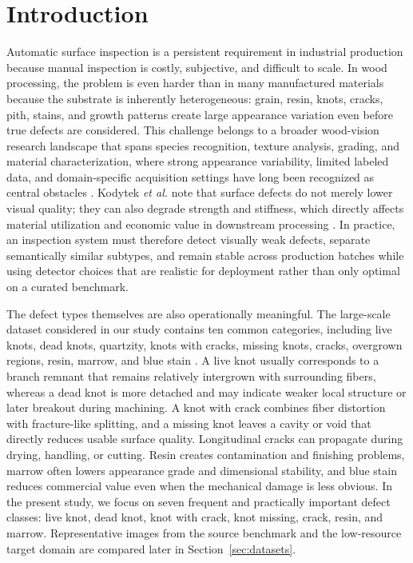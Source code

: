 
\section{Introduction}
\label{sec:introduction}

Automatic surface inspection is a persistent requirement in industrial production because manual inspection is costly, subjective, and difficult to scale. In wood processing, the problem is even harder than in many manufactured materials because the substrate is inherently heterogeneous: grain, resin, knots, cracks, pith, stains, and growth patterns create large appearance variation even before true defects are considered. This challenge belongs to a broader wood-vision research landscape that spans species recognition, texture analysis, grading, and material characterization, where strong appearance variability, limited labeled data, and domain-specific acquisition settings have long been recognized as central obstacles \citep{hwang_sugiyama_review,da_silva_2017,souza_2020,de_geus_2021,kirbas_2022,he_2021_woodresearch,herrera_poyatos_2024}. Kodytek \textit{et al.} note that surface defects do not merely lower visual quality; they can also degrade strength and stiffness, which directly affects material utilization and economic value in downstream processing \citep{kodytek_dataset}. In practice, an inspection system must therefore detect visually weak defects, separate semantically similar subtypes, and remain stable across production batches while using detector choices that are realistic for deployment rather than only optimal on a curated benchmark.

The defect types themselves are also operationally meaningful. The large-scale dataset considered in our study contains ten common categories, including live knots, dead knots, quartzity, knots with cracks, missing knots, cracks, overgrown regions, resin, marrow, and blue stain \citep{kodytek_dataset}. A live knot usually corresponds to a branch remnant that remains relatively intergrown with surrounding fibers, whereas a dead knot is more detached and may indicate weaker local structure or later breakout during machining. A knot with crack combines fiber distortion with fracture-like splitting, and a missing knot leaves a cavity or void that directly reduces usable surface quality. Longitudinal cracks can propagate during drying, handling, or cutting. Resin creates contamination and finishing problems, marrow often lowers appearance grade and dimensional stability, and blue stain reduces commercial value even when the mechanical damage is less obvious. In the present study, we focus on seven frequent and practically important defect classes: live knot, dead knot, knot with crack, knot missing, crack, resin, and marrow. Representative images from the source benchmark and the low-resource target domain are compared later in Section~\ref{sec:datasets}.

